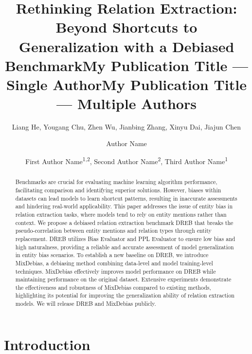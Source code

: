 \documentclass[letterpaper]{article} %
\title{Rethinking Relation Extraction: Beyond Shortcuts to Generalization with a Debiased Benchmark}
\author{
    Liang He, Yougang Chu, Zhen Wu, Jianbing Zhang, Xinyu Dai, Jiajun Chen \\
}
\title{My Publication Title --- Single Author}
\author {
    Author Name
}
\title{My Publication Title --- Multiple Authors}
\author {
    First Author Name\textsuperscript{\rm 1,\rm 2},
    Second Author Name\textsuperscript{\rm 2},
    Third Author Name\textsuperscript{\rm 1}
}
\begin{document}
\maketitle

\begin{abstract}
Benchmarks are crucial for evaluating machine learning algorithm performance, facilitating comparison and identifying superior solutions. However, biases within datasets can lead models to learn shortcut patterns, resulting in inaccurate assessments and hindering real-world applicability. This paper addresses the issue of entity bias in relation extraction tasks, where models tend to rely on entity mentions rather than context. We propose a debiased relation extraction benchmark DREB that breaks the pseudo-correlation between entity mentions and relation types through entity replacement. DREB utilizes Bias Evaluator and PPL Evaluator to ensure low bias and high naturalness, providing a reliable and accurate assessment of model generalization in entity bias scenarios. To establish a new baseline on DREB, we introduce MixDebias, a debiasing method combining data-level and model training-level techniques. MixDebias effectively improves model performance on DREB while maintaining performance on the original dataset. Extensive experiments demonstrate the effectiveness and robustness of MixDebias compared to existing methods, highlighting its potential for improving the generalization ability of relation extraction models. We will release DREB and MixDebias publicly.
\end{abstract}

%

\section{Introduction}
\end{document}
